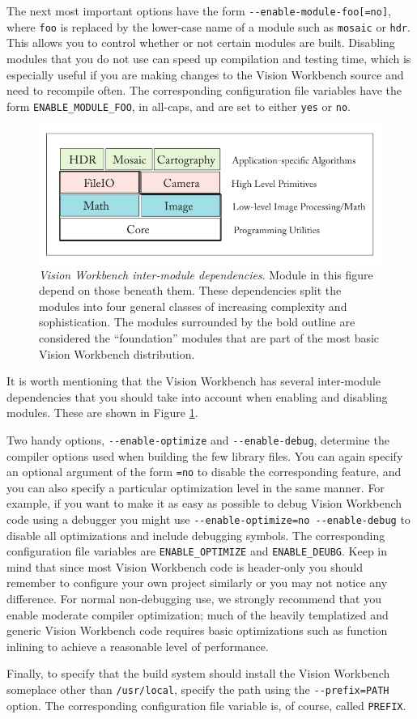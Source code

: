 The next most important options have the form
\verb#--enable-module-foo[=no]#, where \verb#foo# is replaced by the
lower-case name of a module such as \verb#mosaic# or \verb#hdr#.  This
allows you to control whether or not certain modules are built.
Disabling modules that you do not use can speed up compilation and
testing time, which is especially useful if you are making changes to
the Vision Workbench source and need to recompile often.  The
corresponding configuration file variables have the form
\verb#ENABLE_MODULE_FOO#, in all-caps, and are set to either
\verb#yes# or \verb#no#.

\begin{figure}[bt]
\begin{center}
  \includegraphics[width=6in]{images/module_dependencies.pdf}
 \end{center}
  \label{fig:module-dependencies}
  \caption{{\em Vision Workbench inter-module dependencies}.  Module in this
    figure depend on those beneath them.  These dependencies split the
    modules into four general classes of increasing complexity and
    sophistication.  The modules surrounded by the bold outline are
    considered the ``foundation'' modules that are part of the most
    basic Vision Workbench distribution.}
\end{figure}

It is worth mentioning that the Vision Workbench has several
inter-module dependencies that you should take into account when
enabling and disabling modules.  These are shown in Figure
\ref{fig:module-dependencies}.

Two handy options, \verb#--enable-optimize# and \verb#--enable-debug#,
determine the compiler options used when building the few library
files.  You can again specify an optional argument of the form
\verb#=no# to disable the corresponding feature, and you can also
specify a particular optimization level in the same manner.  For
example, if you want to make it as easy as possible to debug Vision
Workbench code using a debugger you might use
\verb#--enable-optimize=no --enable-debug# to disable all
optimizations and include debugging symbols.  The corresponding
configuration file variables are \verb#ENABLE_OPTIMIZE# and
\verb#ENABLE_DEUBG#.  Keep in mind that since most Vision Workbench
code is header-only you should remember to configure your own project
similarly or you may not notice any difference.  For normal
non-debugging use, we strongly recommend that you enable moderate
compiler optimization; much of the heavily templatized and generic
Vision Workbench code requires basic optimizations such as function
inlining to achieve a reasonable level of performance.

Finally, to specify that the build system should install the Vision Workbench 
someplace other than \verb#/usr/local#, specify the path using the 
\verb#--prefix=PATH# option.   The corresponding configuration file 
variable is, of course, called \verb#PREFIX#.
